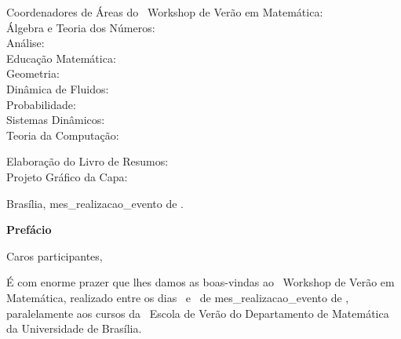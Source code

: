\begin{flushleft}
		\noindent Coordenadores de \'{A}reas do \edworkshop\ Workshop de Ver\~{a}o em Matem\'{a}tica: \\
		\noindent \'{A}lgebra e Teoria dos N\'{u}meros: \coordalgebratn \\
		\noindent An\'{a}lise: \coordanalise \\
		\noindent Educa\c{c}\~{a}o Matem\'{a}tica: \coordedumat\\
		\noindent Geometria: \coordgeometria \\
		\noindent Dinâmica de Fluidos: \coorddinflui \\
		\noindent Probabilidade: \coordprobab \\
		\noindent Sistemas Din\^{a}micos:  \coordsistdin \\
		\noindent Teoria da Computa\c{c}\~{a}o: \coordteocomp\\
	\end{flushleft}
	
	\vspace{1.15cm}
	
	\noindent Elabora\c{c}\~{a}o do Livro de Resumos: \livresumos \\
	\noindent Projeto Gr\'{a}fico da Capa: \artcapa
	
	\vspace{1.15cm}
	
	\begin{center}
		Bras\'{i}lia, mes_realizacao_evento de \ano.
	\end{center}
	
	\newpage\clearpage
	
	
	
	

	\begin{center}
	\huge{{\bf Pref\'{a}cio}}
	\vspace{1cm}
	\end{center}

Caros participantes,

\vspace{24pt}

\'{E} com enorme prazer que lhes damos as boas-vindas ao \edworkshop\ Workshop de Ver\~{a}o em Matem\'{a}tica, realizado entre os dias \datainic\ e \datafim\ de mes_realizacao_evento de \ano, paralelamente aos cursos da \edverao\ Escola de Ver\~{a}o do Departamento de Matem\'{a}tica da Universidade de Bras\'{i}lia.

